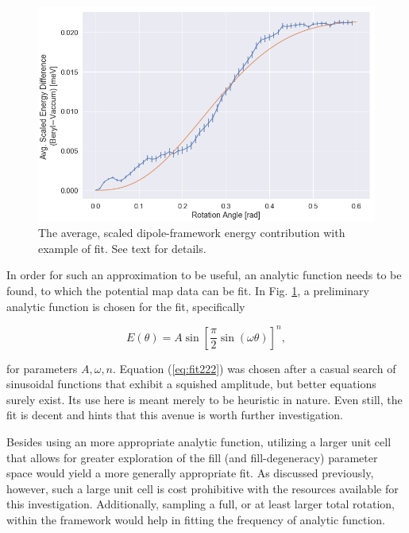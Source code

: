         \begin{figure}
            \centering
            \includegraphics[width=0.9\linewidth]{Figures/System/diff_analysis_fit.png}
            \caption{The average, scaled dipole-framework energy contribution with example of fit. See text for details.}
            \label{fig:framework_contribution_fit}
        \end{figure}
        
        In order for such an approximation to be useful, an analytic function needs to be found, to which the potential map data can be fit. In Fig. \ref{fig:framework_contribution_fit}, a preliminary analytic function is chosen for the fit, specifically
        
        \begin{equation}
        \label{eq:fit222}
            E(\theta) = A\sin\left[\frac{\pi}{2} \sin\left( \omega \theta \right)\right]^n,
        \end{equation}

        \noindent for parameters $A,\omega,n$. Equation (\ref{eq:fit222}) was chosen after a casual search of sinusoidal functions that exhibit a squished amplitude, but better equations surely exist. Its use here is meant merely to be heuristic in nature. Even still, the fit is decent and hints that this avenue is worth further investigation. 
        
        Besides using an more appropriate analytic function, utilizing a larger unit cell that allows for greater exploration of the fill (and fill-degeneracy) parameter space would yield a more generally appropriate fit. As discussed previously, however, such a large unit cell is cost prohibitive with the resources available for this investigation. Additionally, sampling a full, or at least larger total rotation, within the framework would help in fitting the frequency of analytic function.
        
